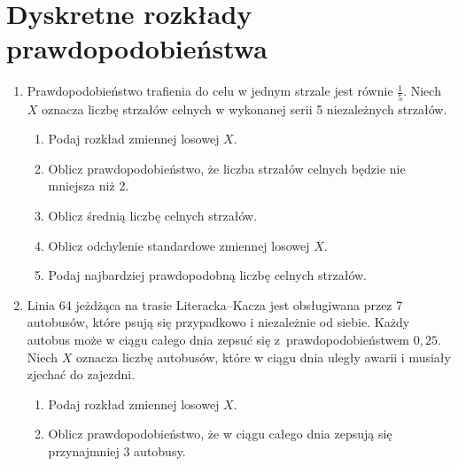 \documentclass[twoside]{mwart}
\newcommand{\ans}[1]{}
\newcommand{\ans}[1]{\par\emph{Odpowiedź:} #1}
\begin{document}
\section{Dyskretne rozkłady prawdopodobieństwa}
\begin{enumerate}
\item Prawdopodobieństwo trafienia do celu w jednym strzale jest równie $\frac{1}{5}$. Niech $X$ oznacza liczbę strzałów celnych w wykonanej serii 5 niezależnych strzałów. 
\begin{enumerate}
\item Podaj rozkład zmiennej losowej $X$. \ans{
	Mamy do czynienia z powtarzającymi się próbami, niezależnymi od siebie, o stałym prawdopodobieństwie sukcesu i których liczba jest z góry ustalona. Zatem korzystamy z rozkładu dwumianowego:
	\[P(X=k)={5 \choose k}\left(\frac{1}{5}\right)^k\left(\frac{4}{5}\right)^{5-k} \qquad k\in\{0,1,\ldots,5\}\]
}
\item Oblicz prawdopodobieństwo, że liczba strzałów celnych będzie nie mniejsza niż 2. \ans{$P(X\geq 2)=1-P(X=0)-P(X=1)=1-\frac{4^5}{5^5}-5\cdot\frac{4^4}{5^5}=\frac{821}{3125}\approx0{,}263$}
\item Oblicz średnią liczbę celnych strzałów. \ans{$EX=np=1$}
\item Oblicz odchylenie standardowe zmiennej losowej $X$. \ans{$DX=\sqrt{np(1-p)}=\sqrt{\frac{4}{5}}$}
\item Podaj najbardziej prawdopodobną liczbę celnych strzałów. \ans{
	Patrzymy czy iloczyn $(n+1)p$ jest liczbą całkowitą. W tym przypadku nie jest ($(n+1)p=\frac{6}{5}$), a zatem jest jeden punkt najbardziej prawdopodobny:
	$\lfloor(n+1)p\rfloor=1$}
\end{enumerate}
\item Linia 64 jeżdżąca na trasie Literacka--Kacza jest obsługiwana przez 7 autobusów, które psują się przypadkowo i niezależnie od siebie. Każdy autobus może w ciągu całego dnia zepsuć się z~prawdopodobieństwem $0{,}25$. Niech $X$ oznacza liczbę autobusów, które w ciągu dnia uległy awarii i musiały zjechać do zajezdni.
\begin{enumerate}
\item Podaj rozkład zmiennej losowej $X$.
\ans{
	Mamy do czynienia z sytuacją analogiczną jak w poprzednim zadaniu, a zatem
	\[ P(X=k)={7\choose k}\left(0{,}25\right)^k\left(0{,}75\right)^{7-k} \qquad k\in\{0,1,\ldots,7\} \]
}
\item Oblicz prawdopodobieństwo, że w ciągu całego dnia zepsują się przynajmniej 3 autobusy.
\ans{
	\begin{align*}

\end{align*}}
\end{enumerate}
\end{enumerate}
\end{document}
